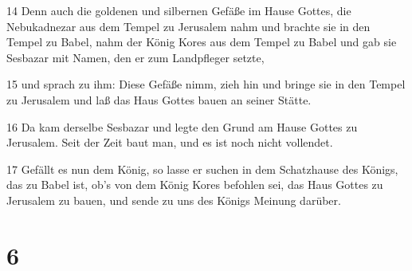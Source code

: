 \par 14 Denn auch die goldenen und silbernen Gefäße im Hause Gottes, die Nebukadnezar aus dem Tempel zu Jerusalem nahm und brachte sie in den Tempel zu Babel, nahm der König Kores aus dem Tempel zu Babel und gab sie Sesbazar mit Namen, den er zum Landpfleger setzte,
\par 15 und sprach zu ihm: Diese Gefäße nimm, zieh hin und bringe sie in den Tempel zu Jerusalem und laß das Haus Gottes bauen an seiner Stätte.
\par 16 Da kam derselbe Sesbazar und legte den Grund am Hause Gottes zu Jerusalem. Seit der Zeit baut man, und es ist noch nicht vollendet.
\par 17 Gefällt es nun dem König, so lasse er suchen in dem Schatzhause des Königs, das zu Babel ist, ob's von dem König Kores befohlen sei, das Haus Gottes zu Jerusalem zu bauen, und sende zu uns des Königs Meinung darüber.

\chapter{6}

